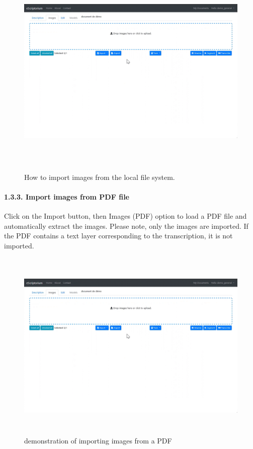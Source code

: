 \documentclass[
]{book}
\begin{document}
\begin{figure}
\centering
\includegraphics[width=6.5in,height=4.08333in]{img/eScrTut/image6.gif}
\caption{How to import images from the local file system.}
\end{figure}

\hypertarget{import-images-from-pdf-file}{%
\paragraph{1.3.3. Import images from PDF file}\label{import-images-from-pdf-file}}

Click on the Import button, then Images (PDF) option to load a PDF file
and automatically extract the images. Please note, only the images are
imported. If the PDF contains a text layer corresponding to the
transcription, it is not imported.

\begin{figure}
\centering
\includegraphics[width=6.04945in,height=3.63278in]{img/eScrTut/image7.gif}
\caption{demonstration of importing images from a
PDF}
\end{figure}
\end{document}
